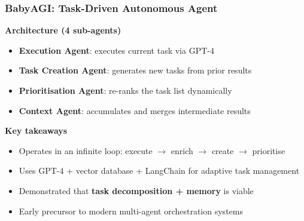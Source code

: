 \begin{frame}[fragile]
\frametitle{BabyAGI: Task-Driven Autonomous Agent}

\textbf{Architecture (4 sub-agents)}
\begin{itemize}
    \item \textbf{Execution Agent}: executes current task via GPT-4
    \item \textbf{Task Creation Agent}: generates new tasks from prior results
    \item \textbf{Prioritisation Agent}: re-ranks the task list dynamically
    \item \textbf{Context Agent}: accumulates and merges intermediate results
\end{itemize}

\textbf{Key takeaways}
\begin{itemize}
    \item Operates in an infinite loop: execute $\rightarrow$ enrich $\rightarrow$ create $\rightarrow$ prioritise
    \item Uses GPT-4 + vector database + LangChain for adaptive task management
    \item Demonstrated that \textbf{task decomposition + memory} is viable
    \item Early precursor to modern multi-agent orchestration systems
\end{itemize}

\end{frame}
